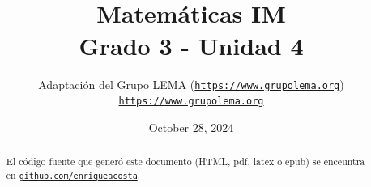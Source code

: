 \documentclass[twoside,10pt,]{article}
\title{Matemáticas IM\textsuperscript{\textregistered}\\
{\large Grado 3 - Unidad 4}}
\author{Adaptación del Grupo LEMA (\href{https://www.grupolema.org}{\nolinkurl{https://www.grupolema.org}})\\
\href{https://www.grupolema.org}{\nolinkurl{https://www.grupolema.org}}
}
\date{October 28, 2024}
\begin{document}
\raggedbottom
\label{gra3-uni4}\hypertarget{gra3-uni4}{}
\maketitle
\thispagestyle{empty}
\renewcommand*{\abstractname}{Resumen}
\begin{abstract}
\end{abstract}
\renewcommand*{\abstractname}{Resumen}
\begin{abstract}
El código fuente que generó este documento (HTML, pdf, latex o epub) se enceuntra en \href{https://github.com/enriqueacosta/IllustrativeMath-GrupoLEMA}{\nolinkurl{github.com/enriqueacosta}}.%
\end{abstract}
\renewcommand*{\abstractname}{Resumen}
\end{document}
